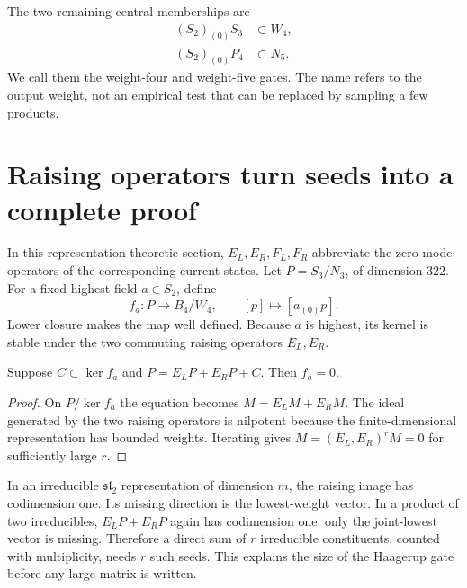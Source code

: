 The two remaining central memberships are
\begin{align}
 (S_2)_{(0)}S_3&\subset W_4,
 \label{eq:c-gate4}\\
 (S_2)_{(0)}P_4&\subset N_5.
 \label{eq:c-gate5}
\end{align}
We call them the weight-four and weight-five gates. The name refers
to the output weight, not an empirical test that can be replaced by
sampling a few products.

\section{Raising operators turn seeds into a complete proof}

In this representation-theoretic section, $E_L,E_R,F_L,F_R$
abbreviate the zero-mode operators of the corresponding current states.
Let $P=S_3/N_3$, of dimension $322$. For a fixed highest field
$a\in S_2$, define
\[
 f_a:P\longrightarrow B_4/W_4,\qquad[p]\longmapsto[a_{(0)}p].
\]
Lower closure makes the map well defined. Because $a$ is highest,
its kernel is stable under the two commuting raising operators
$E_L,E_R$.

\begin{lemma}\label{lem:c-raising}
Suppose $C\subset\ker f_a$ and
$P=E_LP+E_RP+C$. Then $f_a=0$.
\end{lemma}
\begin{proof}
On $P/\ker f_a$ the equation becomes $M=E_LM+E_RM$.
The ideal generated by the two raising operators is nilpotent because
the finite-dimensional representation has bounded weights. Iterating
gives $M=(E_L,E_R)^rM=0$ for sufficiently large $r$.
\end{proof}

\begin{example}
In an irreducible $\mathfrak{sl}_2$ representation of dimension $m$,
the raising image has codimension one. Its missing direction is the
lowest-weight vector. In a product of two irreducibles,
$E_LP+E_RP$ again has codimension one: only the joint-lowest vector
is missing. Therefore a direct sum of $r$ irreducible constituents,
counted with multiplicity, needs $r$ such seeds. This explains the
size of the Haagerup gate before any large matrix is written.
\end{example}

